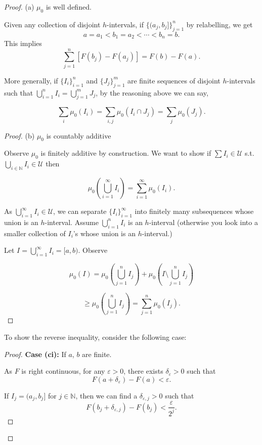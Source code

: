 \documentclass[11pt]{article}
\theoremstyle{definition}
\theoremstyle{remark}
\begin{document}
\begin{proof}
(a) $\mu_0$ is well defined.

Given any collection of disjoint $h$-intervals, if $\{(a_j, b_j]\}_{j=1}^n$ by relabelling, we get
\[ a = a_1 < b_1 = a_2 < \cdots < b_n = b. \]
This implies
\[ \sum_{j=1}^n [F(b_j) - F(a_j)] = F(b) - F(a). \]

More generally, if $\{I_i\}_{i=1}^n$ and $\{J_j\}_{j=1}^m$ are finite sequences of disjoint $h$-intervals such that $\bigcup_{i=1}^n I_i = \bigcup_{j=1}^m J_j$, by the reasoning above we can say,

\[
\sum_{i} \mu_0(I_i) = \sum_{i,j} \mu_0(I_i \cap J_j) = \sum_{j} \mu_0(J_j).
\]

\begin{proof}
(b) $\mu_0$ is countably additive

Observe $\mu_0$ is finitely additive by construction. We want to show if $\sum I_i \in \mathcal{U}$ s.t. $\bigcup_{i \in \mathbb{N}} I_i \in \mathcal{U}$ then

\[
\mu_0\left(\bigcup_{i=1}^\infty I_i\right) = \sum_{i=1}^\infty \mu_0(I_i).
\]

As $\bigcup_{i=1}^\infty I_i \in \mathcal{U}$, we can separate $\{I_i\}_{i=1}^\infty$ into finitely many subsequences whose union is an $h$-interval. Assume $\bigcup_{i=1}^n I_i$ is an $h$-interval (otherwise you look into a smaller collection of $I_i$'s whose union is an $h$-interval.)

Let $I = \bigcup_{i=1}^\infty I_i = [a, b)$. Observe

\[
\mu_0(I) = \mu_0\left(\bigcup_{j=1}^n I_j\right) + \mu_0\left(I \setminus \bigcup_{j=1}^n I_j\right)
\]

\[
\geq \mu_0\left(\bigcup_{j=1}^n I_j\right) = \sum_{j=1}^n \mu_0(I_j).
\]
\end{proof}

To show the reverse inequality, consider the following case:

\begin{proof}
\textbf{Case (ci):} If $a$, $b$ are finite.

As $F$ is right continuous, for any $\varepsilon > 0$, there exists $\delta_\varepsilon > 0$ such that
\[ F(a + \delta_\varepsilon) - F(a) < \varepsilon. \]

If $I_j = (a_j, b_j]$ for $j \in \mathbb{N}$, then we can find a $\delta_{\varepsilon, j} > 0$ such that
\[ F(b_j + \delta_{\varepsilon, j}) - F(b_j) < \frac{\varepsilon}{2^j}. \]


\end{proof}
\end{proof}
\end{document}
